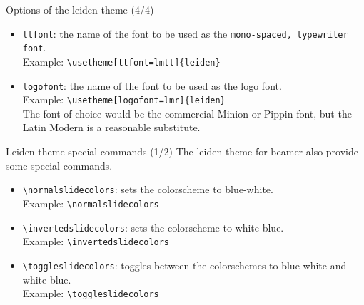 \begin{frame}[fragile]{Options of the leiden theme (4/4)}
\begin{itemize}
\item	\alert{\texttt{ttfont}}: the name of the font to be
		used as the \texttt{mono-spaced, typewriter font}.\\
\vspace{0.1\baselineskip}
		Example: \verb|\usetheme[ttfont=lmtt]{leiden}|
\vspace{0.5\baselineskip}
\item	\alert{\texttt{logofont}}: the name of the font to be
		used as the logo font.\\
\vspace{0.1\baselineskip}
		Example: \verb|\usetheme[logofont=lmr]{leiden}|\\
\vspace{0.1\baselineskip}
		The font of choice would be the commercial Minion or
		Pippin font, but the Latin Modern is a reasonable
		substitute.
\end{itemize}
\end{frame}


\begin{frame}[fragile]{Leiden theme special commands (1/2)}
The leiden theme for beamer also provide some special commands.
\begin{itemize}
\item	\alert{\texttt{\textbackslash normalslidecolors}}: sets the
		colorscheme to blue-white.\\
\vspace{0.1\baselineskip}
		Example: \verb|\normalslidecolors|\\
\vspace{0.5\baselineskip}

\item	\alert{\texttt{\textbackslash invertedslidecolors}}: sets the
		colorscheme to white-blue.\\
\vspace{0.1\baselineskip}
		Example: \verb|\invertedslidecolors|\\
\vspace{0.5\baselineskip}

\item	\alert{\texttt{\textbackslash toggleslidecolors}}: toggles between
		the colorschemes to blue-white and white-blue.\\
\vspace{0.1\baselineskip}
		Example: \verb|\toggleslidecolors|\\
\end{itemize}
\end{frame}

